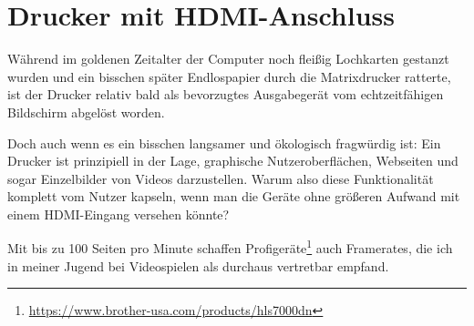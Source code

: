 \documentclass[a5paper,pagesize,10pt,bibtotoc,pointlessnumbers,normalheadings,DIV=9,twoside=false]{scrbook}
\begin{document}


\chapter{Drucker mit HDMI-Anschluss}

Während im goldenen Zeitalter der Computer noch fleißig Lochkarten gestanzt wurden und ein bisschen später Endlospapier durch die Matrixdrucker ratterte, ist der Drucker relativ bald als bevorzugtes Ausgabegerät vom echtzeitfähigen Bildschirm abgelöst worden.

Doch auch wenn es ein bisschen langsamer und ökologisch fragwürdig ist:
Ein Drucker ist prinzipiell in der Lage, graphische Nutzeroberflächen, Webseiten und sogar Einzelbilder von Videos darzustellen.
Warum also diese Funktionalität komplett vom Nutzer kapseln, wenn man die Geräte ohne größeren Aufwand mit einem HDMI-Eingang versehen könnte?

Mit bis zu 100 Seiten pro Minute schaffen Profigeräte\footnote{\url{https://www.brother-usa.com/products/hls7000dn}} auch Framerates, die ich in meiner Jugend bei Videospielen als durchaus vertretbar empfand.

\end{document}
